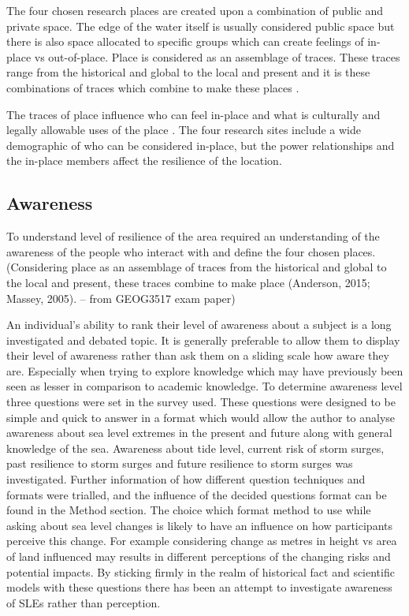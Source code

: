 \documentclass{article}
\begin{document}
The four chosen research places are created upon a combination of public and private space. The edge of the water itself is usually considered public space but there is also space allocated to specific groups which can create feelings of in-place vs out-of-place. Place is considered as an assemblage of traces. These traces range from the historical and global to the local and present and it is these combinations of traces which combine to make these places \cite{anderson_understanding_2015} \cite{massey_for_2005}.

The traces of place influence who can feel in-place and what is culturally and legally allowable uses of the place \cite{anderson_understanding_2015}. The four research sites include a wide demographic of who can be considered in-place, but the power relationships and the in-place members affect the resilience of the location. 

\subsection{Awareness}
To understand level of resilience of the area required an understanding of the awareness of the people who interact with and define the four chosen places. (Considering place as an assemblage of traces from the historical and global to the local and present, these traces combine to make place (Anderson, 2015; Massey, 2005). – from GEOG3517 exam paper)

An individual’s ability to rank their level of awareness about a subject is a long investigated and debated topic. It is generally preferable to allow them to display their level of awareness rather than ask them on a sliding scale how aware they are. Especially when trying to explore knowledge which may have previously been seen as lesser in comparison to academic knowledge. 
To determine awareness level three questions were set in the survey used. These questions were designed to be simple and quick to answer in a format which would allow the author to analyse awareness about sea level extremes in the present and future along with general knowledge of the sea. 
Awareness about tide level, current risk of storm surges, past resilience to storm surges and future resilience to storm surges was investigated. Further information of how different question techniques and formats were trialled, and the influence of the decided questions format can be found in the Method section. The choice which format method to use while asking about sea level changes is likely to have an influence on how participants perceive this change. For example considering change as metres in height vs area of land influenced may results in different perceptions of the changing risks and potential impacts.  By sticking firmly in the realm of historical fact and scientific models with these questions there has been an attempt to investigate awareness of SLEs rather than perception. 
\end{document}
